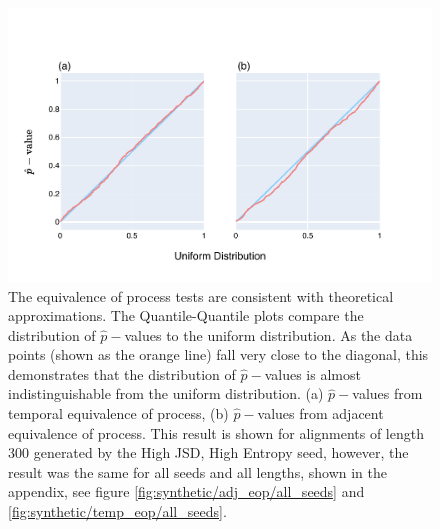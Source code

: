 \begin{figure}[!htb]
\centering
\includegraphics[width=\textwidth]{figures/plots/synthetic/adj-temp_eop/High JSD, High Entropy.pdf}
\caption{The equivalence of process tests are consistent with theoretical approximations. The Quantile-Quantile plots compare the distribution of $\hat p-$values to the uniform distribution. As the data points (shown as the orange line) fall very close to the diagonal, this demonstrates that the distribution of $\hat p-$values is almost indistinguishable from the uniform distribution. (a) $\hat p-$values from temporal equivalence of process, (b) $\hat p-$values from adjacent equivalence of process. This result is shown for alignments of length 300 generated by the High JSD, High Entropy seed, however, the result was the same for all seeds and all lengths, shown in the appendix, see figure \ref{fig:synthetic/adj_eop/all_seeds} and \ref{fig:synthetic/temp_eop/all_seeds}.}
\label{fig:synthetic/adj-temp_eop/HighJSDHighEntropy}
\end{figure}